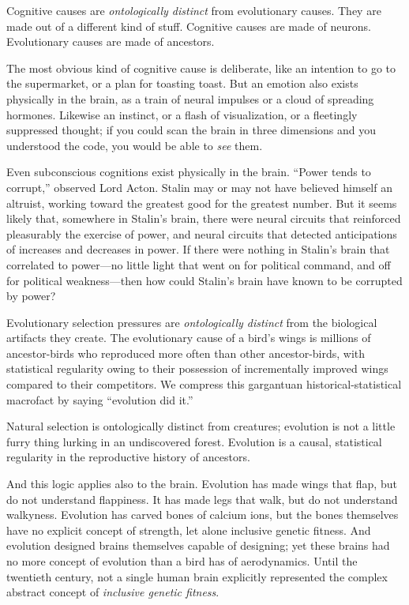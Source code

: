 {
 Cognitive causes are \textit{ontologically distinct} from
evolutionary causes. They are made out of a different kind of stuff.
Cognitive causes are made of neurons. Evolutionary causes are made of
ancestors.}

{
 The most obvious kind of cognitive cause is deliberate, like an
intention to go to the supermarket, or a plan for toasting toast. But
an emotion also exists physically in the brain, as a train of neural
impulses or a cloud of spreading hormones. Likewise an instinct, or a
flash of visualization, or a fleetingly suppressed thought; if you
could scan the brain in three dimensions and you understood the code,
you would be able to \textit{see} them.}

{
 Even subconscious cognitions exist physically in the brain.
``Power tends to corrupt,'' observed
Lord Acton. Stalin may or may not have believed himself an altruist,
working toward the greatest good for the greatest number. But it seems
likely that, somewhere in Stalin's brain, there were
neural circuits that reinforced pleasurably the exercise of power, and
neural circuits that detected anticipations of increases and decreases
in power. If there were nothing in Stalin's brain that
correlated to power---no little light that went on for political
command, and off for political weakness---then how could
Stalin's brain have known to be corrupted by power?}

{
 Evolutionary selection pressures are \textit{ontologically
distinct} from the biological artifacts they create. The evolutionary
cause of a bird's wings is millions of ancestor-birds
who reproduced more often than other ancestor-birds, with statistical
regularity owing to their possession of incrementally improved wings
compared to their competitors. We compress this gargantuan
historical-statistical macrofact by saying ``evolution
did it.''}

{
 Natural selection is ontologically distinct from creatures;
evolution is not a little furry thing lurking in an undiscovered
forest. Evolution is a causal, statistical regularity in the
reproductive history of ancestors.}

{
 And this logic applies also to the brain. Evolution has made wings
that flap, but do not understand flappiness. It has made legs that
walk, but do not understand walkyness. Evolution has carved bones of
calcium ions, but the bones themselves have no explicit concept of
strength, let alone inclusive genetic fitness. And evolution designed
brains themselves capable of designing; yet these brains had no more
concept of evolution than a bird has of aerodynamics. Until the
twentieth century, not a single human brain explicitly represented the
complex abstract concept of \textit{inclusive genetic fitness}.}

